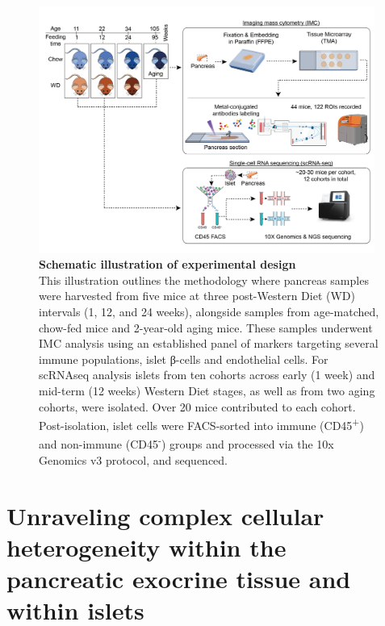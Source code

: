 \begin{figure}[H]
\centering
\includegraphics[width=11cm]{Chapter4/Fig/F2-1-01.png}
\caption[Experimental Design]{\textbf{Schematic illustration of experimental design}\\This illustration outlines the methodology where pancreas samples were harvested from five mice at three post-Western Diet (WD) intervals (1, 12, and 24 weeks), alongside samples from age-matched, chow-fed mice and 2-year-old aging mice. These samples underwent IMC analysis using an established panel of markers targeting several immune populations, islet β-cells and endothelial cells. For scRNAseq analysis islets from ten cohorts across early (1 week) and mid-term (12 weeks) Western Diet stages, as well as from two aging cohorts, were isolated. Over 20 mice contributed to each cohort. Post-isolation, islet cells were FACS-sorted into immune (CD45\textsuperscript{+}) and non-immune (CD45\textsuperscript{-}) groups and processed via the 10x Genomics v3 protocol, and sequenced.}
\label{fig:wdaging_experimental_design}
\end{figure}

\section{Unraveling complex cellular heterogeneity within the\\pancreatic exocrine tissue and within islets}
